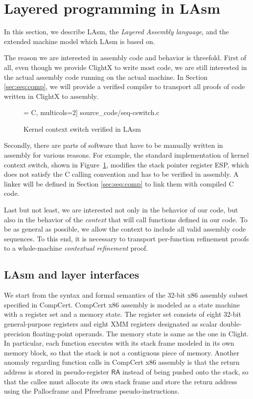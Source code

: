 
\section{Layered programming in LAsm}
\label{sec:seq:lasm}

In this section, we describe LAsm, the \emph{Layered
  Assembly language}, and the extended machine model which LAsm is based on.

The reason we are interested in assembly code and behavior is
threefold.  First of all, even though we provide ClightX to write most
code, we are still interested in the actual assembly code running on
the actual machine. In Section \ref{sec:seq:comp}, we will provide a
verified compiler to transport all proofs of code written in ClightX
to assembly.

\begin{figure}[t]\centering
 = C, multicols=2] {source_code/seq-cswitch.c}
\caption{Kernel context switch verified in LAsm}
\label{fig:contextswitch}
\hrulefill
\end{figure}

Secondly, there are parts of software that have to be manually written
in assembly for various reasons. For example, the standard
implementation of kernel context switch, shown in
Figure~\ref{fig:contextswitch}, 
modifies the stack pointer register
\textsf{ESP}, which does not satisfy the C calling convention and has
to be verified in assembly.  A linker will be defined in Section
\ref{sec:seq:comp} to link them with compiled C code.

Last but not least, we are interested not only in the behavior of our
code, but also in the behavior of the \emph{context} that will call
functions defined in our code. To be as general as possible, we allow
the context to include all valid assembly code sequences. To this end,
it is necessary to transport per-function refinement proofs to a
whole-machine \emph{contextual refinement} proof.


  \subsection{LAsm and layer interfaces}

We start from the syntax and formal semantics of the 32-bit x86
assembly subset specified in CompCert.
CompCert x86 assembly is
modeled as a state machine with a register set and a memory state. 
The register set
consists of eight 32-bit general-purpose registers and eight XMM registers
designated as scalar double-precision floating-point operands.
The memory state is same as the one in Clight.
In particular, each function executes with its stack frame modeled in its
own memory block, so that the stack is not a contiguous piece of
memory.
Another anomaly regarding function calls in CompCert x86 assembly is that
the return address is stored in pseudo-register $\mathsf{RA}$ instead of
being pushed onto the stack, so
that the callee must allocate its own stack frame and
store the return address%
using the \textsf{Pallocframe} and
\textsf{Pfreeframe} pseudo-instructions.

